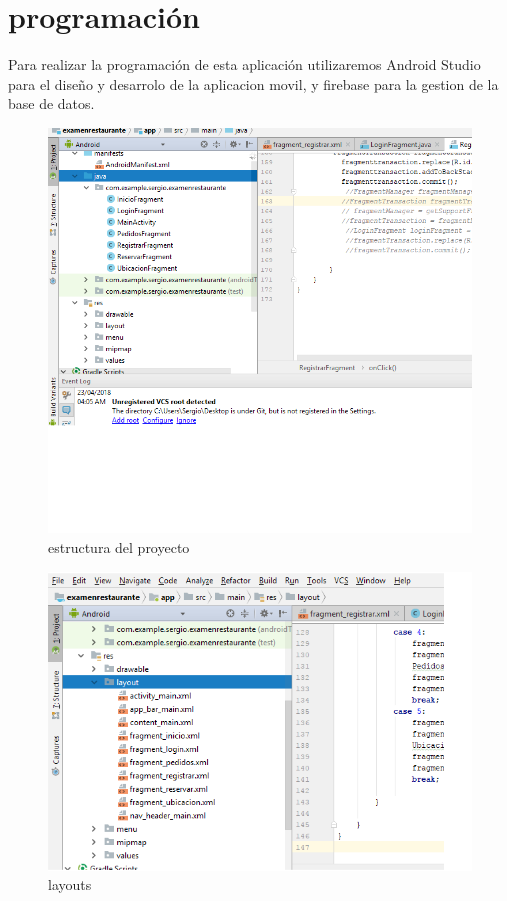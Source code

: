 \section{programación}


Para realizar la programación de esta aplicación utilizaremos Android Studio para el diseño y desarrolo de la aplicacion movil, y firebase para la gestion de la base de datos.

\begin{figure}[H]
\caption{estructura del proyecto}
\centering
\includegraphics[scale=0.80]{imagenes/programacion}

\end{figure}

\begin{figure}[H]
\caption{layouts}
\centering
\includegraphics[scale=0.80]{imagenes/programacion2}

\end{figure}

